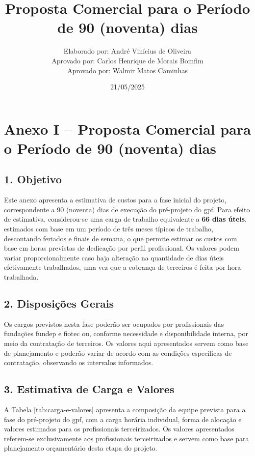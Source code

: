 \documentclass[12pt,a4paper]{report}
\title{Proposta Comercial para o Período de 90 (noventa) dias}
\author{
  Elaborado por: André Vinícius de Oliveira\\
  Aprovado por: Carlos Henrique de Morais Bomfim\\
  Aprovado por: Walmir Matos Caminhas
}
\date{21/05/2025}
\begin{document}
    \chapter*{Anexo I – Proposta Comercial para o Período de 90 (noventa) dias}

    \section*{1. Objetivo}

    Este anexo apresenta a estimativa de custos para a fase inicial do projeto, correspondente a 90 (noventa) dias de execução do pré-projeto do \gls{gpf}. Para efeito de estimativa, considerou-se uma carga de trabalho equivalente a \textbf{66 dias úteis}, estimados com base em um período de três meses típicos de trabalho, descontando feriados e finais de semana, o que permite estimar os custos com base em horas previstas de dedicação por perfil profissional. Os valores podem variar proporcionalmente caso haja alteração na quantidade de dias úteis efetivamente trabalhados, uma vez que a cobrança de terceiros é feita por hora trabalhada.

    \section*{2. Disposições Gerais}

    Os cargos previstos nesta fase poderão ser ocupados por profissionais das fundações \gls{fundep} e \gls{fiotec} ou, conforme necessidade e disponibilidade interna, por meio da contratação de terceiros. Os valores aqui apresentados servem como base de planejamento e poderão variar de acordo com as condições específicas de contratação, observando os intervalos informados.

    \section*{3. Estimativa de Carga e Valores}

    A Tabela \ref{tab:carga-e-valores} apresenta a composição da equipe prevista para a fase do pré-projeto do \gls{gpf}, com a carga horária individual, forma de alocação e valores estimados para os profissionais terceirizados. Os valores apresentados referem-se exclusivamente aos profissionais terceirizados e servem como base para planejamento orçamentário desta etapa do projeto.
\end{document}
